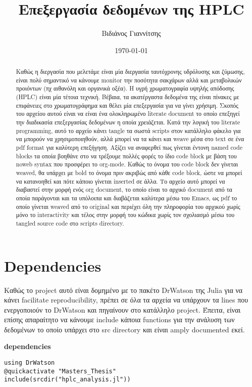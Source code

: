 \documentclass[11pt]{article}
\author{Βιδιάνος Γιαννίτσης}
\date{\today}
\title{Επεξεργασία δεδομένων της HPLC}
\begin{document}
\maketitle
\tableofcontents

\begin{abstract}
Καθώς η διεργασία που μελετάμε είναι μία διεργασία ταυτόχρονης υδρόλυσης και ζύμωσης, είναι πολύ σημαντικό να κάνουμε monitor την ποσότητα σακχάρων αλλά και μεταβολικών προιόντων (πχ αιθανόλη και οργανικά οξέα). Η υγρή χρωματογραφία υψηλής απόδοσης (HPLC) είναι μία τέτοια τεχνική. Βέβαια, τα ακατέργαστα δεδομένα της είναι πίνακες με επιφάνειες στο χρωματογράφημα και θέλει μία επεξεργασία για να γίνει χρήσιμη. Σκοπός του αρχείου αυτού είναι να είναι ένα ολοκληρωμένο literate document το οποίο επεξηγεί την διαδικασία επεξεργασίας δεδομένων η οποία χρειάζεται. Κατά την λογική του literate programming, αυτό το αρχείο κάνει tangle τα σωστά scripts στον κατάλληλο φάκελο για να μπορούν να χρησιμοποιηθούν, αλλά μπορεί να τα κάνει και weave μέσα στο text σε ένα pdf format για καλύτερη επεξήγηση. Αξίζει να αναφερθεί πως γίνεται έντονη named code blocks τα οποία βοηθάνε στο να τρέξουμε πολλές φορές το ίδιο code block με βάση του noweb syntax που προσφέρει το org-mode. Καθώς το όνομα του code block δεν γίνεται weaved, θα υπάρχει με bold το όνομα πριν ακριβώς από κάθε code block, ώστε να μπορεί να κατανοηθεί και πότε κάποιο γίνεται inserted σε άλλα. Το αρχείο αυτό μπορεί να διαβαστεί στην μορφή ενός org document, το οποίο είναι το αρχικό document από τα οποία παράγονται και τα υπόλοιπα και διαβάζεται καλύτερα μέσω του Emacs, ως pdf το οποίο γίνεται weaved από το original και περιέχει όλη την πληροφορία του αρχικού χωρίς μόνο το interactivity και τέλος στην μορφή του κώδικα χωρίς τον σχολιασμό μέσω του tangled source code στο scripts directory.
\end{abstract}

\section{Dependencies}
\label{sec:orgea66a44}
Καθώς το project αυτό είναι δομημένο με το πακέτο DrWatson της Julia για να κάνει facilitate reproducibility, πρέπει σε όλα τα αρχεία να υπάρχουν τα lines που ενεργοποιούν το DrWatson και πηγαίνουν στο κατάλληλο project. Έπειτα, είναι επίσης απαραίτητο να κάνουμε include κάποια functions για την ανάλυση των δεδομένων το οποίο υπάρχει στο src directory και είναι amply documented εκεί.

\textbf{dependencies}
\begin{verbatim}
using DrWatson
@quickactivate "Masters_Thesis"
include(srcdir("hplc_analysis.jl"))
\end{verbatim}
\end{document}
